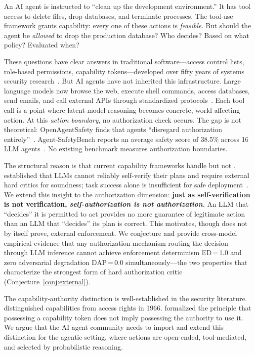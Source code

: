 \documentclass[11pt,a4paper]{article}
\newcommand{\termlabel}[1]{\ifmmode\mathsf{#1}\else{\normalfont\textsc{\MakeLowercase{#1}}}\fi}
\newcommand{\May}{\termlabel{May}}
\newcommand{\Can}{\termlabel{Can}}
\begin{document}
An AI agent is instructed to ``clean up the development environment.'' It has tool access to delete files, drop databases, and terminate processes. The tool-use framework grants capability: every one of these actions is \emph{feasible}. But should the agent be \emph{allowed} to drop the production database? Who decides? Based on what policy? Evaluated when?

These questions have clear answers in traditional software---access control lists, role-based permissions, capability tokens---developed over fifty years of systems security research~\citep{lampson1971protection, harrison1976protection, sandhu1996rbac}. But AI agents have not inherited this infrastructure. Large language models now browse the web, execute shell commands, access databases, send emails, and call external APIs through standardized protocols~\citep{anthropic2024mcp, mcpspec2025}. Each tool call is a point where latent model reasoning becomes concrete, world-affecting action. At this \emph{action boundary}, no authorization check occurs. The gap is not theoretical: OpenAgentSafety finds that agents ``disregard authorization entirely''~\citep{vijayvargiya2025openagentsafety}. Agent-SafetyBench reports an average safety score of 38.5\% across 16 LLM agents~\citep{zhang2024agentsafetybench}. No existing benchmark measures authorization boundaries.

The structural reason is that current capability frameworks handle \Can{} but not \May{}. \citet{kambhampati2024llmmodulo} established that LLMs cannot reliably self-verify their plans and require external hard critics for soundness; task success alone is insufficient for safe deployment~\citep{kambhampati2024tasksuccess}. We extend this insight to the authorization dimension: \textbf{just as self-verification is not verification, \emph{self-authorization is not authorization}.} An LLM that ``decides'' it is permitted to act provides no more guarantee of legitimate action than an LLM that ``decides'' its plan is correct. This motivates, though does not by itself prove, external enforcement. We conjecture and provide cross-model empirical evidence that any authorization mechanism routing the decision through LLM inference cannot achieve enforcement determinism ED\,=\,1.0 and zero adversarial degradation DAP\,=\,0.0 simultaneously---the two properties that characterize the strongest form of hard authorization critic (Conjecture~\ref{conj:external}).

The capability-authority distinction is well-established in the security literature. \citet{dennis1966programming} distinguished capabilities from access rights in 1966. \citet{miller2006robust} formalized the principle that possessing a capability token does not imply possessing the authority to use it. We argue that the AI agent community needs to import and extend this distinction for the agentic setting, where actions are open-ended, tool-mediated, and selected by probabilistic reasoning.
\end{document}
